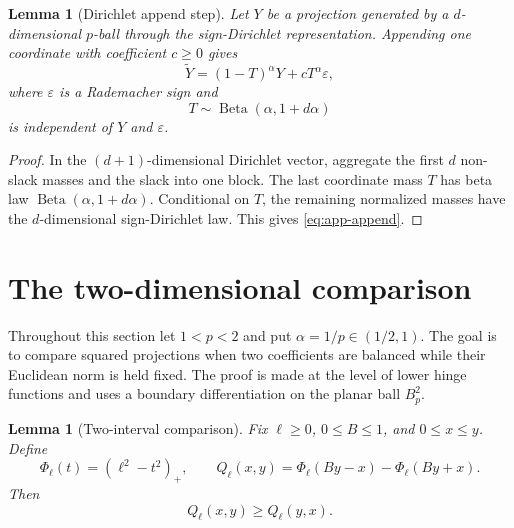 \documentclass[pdflatex,sn-mathphys-num]{sn-jnl}
\numberwithin{equation}{section}
\theoremstyle{thmstyleone}
\newtheorem{lemma}[theorem]{Lemma}
\theoremstyle{thmstylethree}
\newcommand{\1}{\mathbf{1}}
\newcommand{\eps}{\varepsilon}
\begin{document}
\begin{lemma}[Dirichlet append step]\label{lem:app-append-distribution}
Let $Y$ be a projection generated by a $d$-dimensional $p$-ball through the sign-Dirichlet representation. Appending one coordinate with coefficient $c\ge0$ gives
\begin{equation}\label{eq:app-append}
 \widetilde Y=(1-T)^\alpha Y+cT^\alpha\eps,
\end{equation}
where $\eps$ is a Rademacher sign and
\[
 T\sim\operatorname{Beta}(\alpha,1+d\alpha)
\]
is independent of $Y$ and $\eps$.
\end{lemma}

\begin{proof}
In the $(d+1)$-dimensional Dirichlet vector, aggregate the first $d$ non-slack masses and the slack into one block. The last coordinate mass $T$ has beta law $\operatorname{Beta}(\alpha,1+d\alpha)$. Conditional on $T$, the remaining normalized masses have the $d$-dimensional sign-Dirichlet law. This gives \eqref{eq:app-append}.
\end{proof}

\section{The two-dimensional comparison}\label{sec:two-dimensional}

Throughout this section let $1<p<2$ and put $\alpha=1/p\in(1/2,1)$.
The goal is to compare squared projections when two coefficients are
balanced while their Euclidean norm is held fixed. The proof is made
at the level of lower hinge functions and uses a boundary
differentiation on the planar ball $B_p^2$.

\begin{lemma}[Two-interval comparison]\label{lem:app-two-interval}
Fix $\ell\ge0$, $0\le B\le1$, and $0\le x\le y$. Define
\[
 \Phi_\ell(t)=(\ell^2-t^2)_+,
 \qquad
 Q_\ell(x,y)=\Phi_\ell(By-x)-\Phi_\ell(By+x).
\]
Then
\[
 Q_\ell(x,y)\ge Q_\ell(y,x).
\]
\end{lemma}
\end{document}
